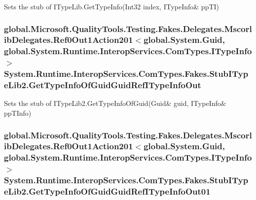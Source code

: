 Sets the stub of I\-Type\-Lib.\-Get\-Type\-Info(Int32 index, I\-Type\-Info\& pp\-T\-I)

\hypertarget{class_system_1_1_runtime_1_1_interop_services_1_1_com_types_1_1_fakes_1_1_stub_i_type_lib2_a7cb891c2141b6405b30ee94787b50942}{
\subsubsection[{Get\-Type\-Info\-Of\-Guid\-Guid\-Ref\-I\-Type\-Info\-Out}]{\setlength{\rightskip}{0pt plus 5cm}global.\-Microsoft.\-Quality\-Tools.\-Testing.\-Fakes.\-Delegates.\-Mscorlib\-Delegates.\-Ref0\-Out1\-Action201$<$global.\-System.\-Guid, global.\-System.\-Runtime.\-Interop\-Services.\-Com\-Types.\-I\-Type\-Info$>$ System.\-Runtime.\-Interop\-Services.\-Com\-Types.\-Fakes.\-Stub\-I\-Type\-Lib2.\-Get\-Type\-Info\-Of\-Guid\-Guid\-Ref\-I\-Type\-Info\-Out}}\label{class_system_1_1_runtime_1_1_interop_services_1_1_com_types_1_1_fakes_1_1_stub_i_type_lib2_a7cb891c2141b6405b30ee94787b50942}


Sets the stub of I\-Type\-Lib2.\-Get\-Type\-Info\-Of\-Guid(Guid\& guid, I\-Type\-Info\& pp\-T\-Info)

\hypertarget{class_system_1_1_runtime_1_1_interop_services_1_1_com_types_1_1_fakes_1_1_stub_i_type_lib2_a60d5570ab1f603d9026b4962d930573d}{
\subsubsection[{Get\-Type\-Info\-Of\-Guid\-Guid\-Ref\-I\-Type\-Info\-Out01}]{\setlength{\rightskip}{0pt plus 5cm}global.\-Microsoft.\-Quality\-Tools.\-Testing.\-Fakes.\-Delegates.\-Mscorlib\-Delegates.\-Ref0\-Out1\-Action201$<$global.\-System.\-Guid, global.\-System.\-Runtime.\-Interop\-Services.\-Com\-Types.\-I\-Type\-Info$>$ System.\-Runtime.\-Interop\-Services.\-Com\-Types.\-Fakes.\-Stub\-I\-Type\-Lib2.\-Get\-Type\-Info\-Of\-Guid\-Guid\-Ref\-I\-Type\-Info\-Out01}}\label{class_system_1_1_runtime_1_1_interop_services_1_1_com_types_1_1_fakes_1_1_stub_i_type_lib2_a60d5570ab1f603d9026b4962d930573d}


